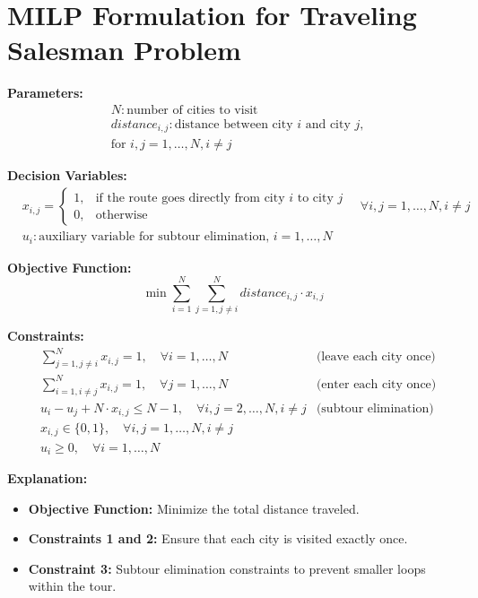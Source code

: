 \documentclass{article}
\begin{document}
\section*{MILP Formulation for Traveling Salesman Problem}

\textbf{Parameters:}
\begin{align*}
    &N: \text{number of cities to visit} \\
    &distance_{i,j}: \text{distance between city } i \text{ and city } j, \\
    &\text{for } i, j = 1, \ldots, N, i \neq j
\end{align*}

\textbf{Decision Variables:}
\begin{align*}
    &x_{i,j} = 
    \begin{cases} 
        1, & \text{if the route goes directly from city } i \text{ to city } j \\
        0, & \text{otherwise}
    \end{cases} \quad \forall i, j = 1, \ldots, N, i \neq j \\
    &u_i: \text{auxiliary variable for subtour elimination, } i = 1, \ldots, N
\end{align*}

\textbf{Objective Function:}
\[
\min \sum_{i=1}^{N} \sum_{j=1, j \neq i}^{N} distance_{i,j} \cdot x_{i,j}
\]

\textbf{Constraints:}
\begin{align}
    &\sum_{j=1, j \neq i}^{N} x_{i,j} = 1, \quad \forall i = 1, \ldots, N &\text{(leave each city once)} \\
    &\sum_{i=1, i \neq j}^{N} x_{i,j} = 1, \quad \forall j = 1, \ldots, N &\text{(enter each city once)} \\
    &u_i - u_j + N \cdot x_{i,j} \leq N-1, \quad \forall i, j = 2, \ldots, N, i \neq j &\text{(subtour elimination)} \\
    &x_{i,j} \in \{0, 1\}, \quad \forall i, j = 1, \ldots, N, i \neq j \\
    &u_i \geq 0, \quad \forall i = 1, \ldots, N
\end{align}

\textbf{Explanation:}
\begin{itemize}
    \item \textbf{Objective Function:} Minimize the total distance traveled.
    \item \textbf{Constraints 1 and 2:} Ensure that each city is visited exactly once.
    \item \textbf{Constraint 3:} Subtour elimination constraints to prevent smaller loops within the tour.
\end{itemize}
\end{document}
